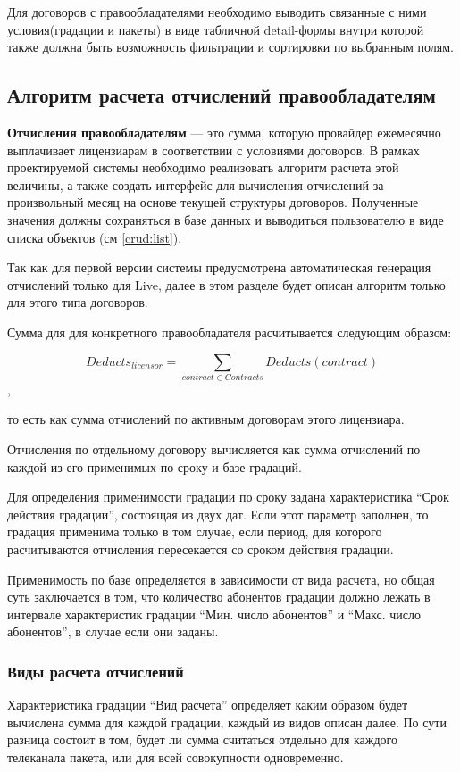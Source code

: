 Для договоров с правообладателями необходимо выводить связанные с ними условия(градации и пакеты)
в виде табличной detail-формы внутри которой также должна быть возможность фильтрации и сортировки по выбранным полям.

\subsection{Алгоритм расчета отчислений правообладателям}
\label{live:deducts}
\textbf{Отчисления правообладателям} --- это сумма, которую провайдер ежемесячно выплачивает лицензиарам
в соответствии с условиями договоров. В рамках проектируемой системы необходимо реализовать алгоритм расчета
этой величины, а также создать интерфейс для вычисления отчислений за произвольный месяц на основе текущей 
структуры договоров. Полученные значения должны сохраняться в базе данных и выводиться пользователю 
в виде списка объектов (см \ref{crud:list}).

Так как для первой версии системы предусмотрена автоматическая генерация отчислений 
только для Live, далее в этом разделе будет описан алгоритм только для этого типа договоров.

Сумма для для конкретного правообладателя расчитывается следующим образом:

$$Deducts_{licensor} = \sum_{contract \in Contracts} Deducts(contract)$$,

то есть как сумма отчислений по активным договорам этого лицензиара. 

Отчисления по отдельному договору вычисляется как сумма отчислений по каждой из его применимых по сроку и базе градаций.

Для определения применимости градации по сроку задана характеристика ``Срок действия градации'', состоящая из двух дат.
Если этот параметр заполнен, то градация применима только в том случае, если период, 
для которого расчитываются отчисления пересекается со сроком действия градации. 

Применимость по базе определяется в зависимости от вида расчета, но общая суть заключается в том, 
что количество абонентов градации должно лежать в интервале характеристик градации ``Мин. число абонентов'' и
``Макс. число абонентов'', в случае если они заданы.  

\subsubsection{Виды расчета отчислений}
Характеристика градации ``Вид расчета'' определяет каким образом будет вычислена сумма для каждой градации,
каждый из видов описан далее. По сути разница состоит в том, будет ли сумма считаться отдельно
для каждого телеканала пакета, или для всей совокупности одновременно.

